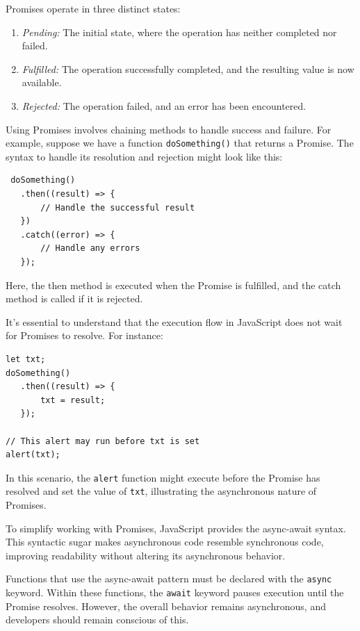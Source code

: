 Promises operate in three distinct states:
\begin{enumerate}
    \item \textit{Pending:} The initial state, where the operation has neither completed nor failed.
    \item \textit{Fulfilled:} The operation successfully completed, and the resulting value is now available.
    \item \textit{Rejected:} The operation failed, and an error has been encountered.
\end{enumerate}
Using Promises involves chaining methods to handle success and failure. For example, suppose we have a function \texttt{doSomething()} that returns a Promise. The syntax to handle its resolution and rejection might look like this:
\begin{verbatim}
 doSomething()
   .then((result) => {
       // Handle the successful result
   })
   .catch((error) => {
       // Handle any errors
   });
\end{verbatim}
Here, the then method is executed when the Promise is fulfilled, and the catch method is called if it is rejected.

It's essential to understand that the execution flow in JavaScript does not wait for Promises to resolve. For instance:
\begin{verbatim}
let txt;
doSomething()
   .then((result) => {
       txt = result;
   });

// This alert may run before txt is set
alert(txt);
\end{verbatim}
In this scenario, the \texttt{alert} function might execute before the Promise has resolved and set the value of \texttt{txt}, illustrating the asynchronous nature of Promises.

To simplify working with Promises, JavaScript provides the async-await syntax. This syntactic sugar makes asynchronous code resemble synchronous code, improving readability without altering its asynchronous behavior.

Functions that use the async-await pattern must be declared with the \texttt{async} keyword. Within these functions, the \texttt{await} keyword pauses execution until the Promise resolves. However, the overall behavior remains asynchronous, and developers should remain conscious of this.

